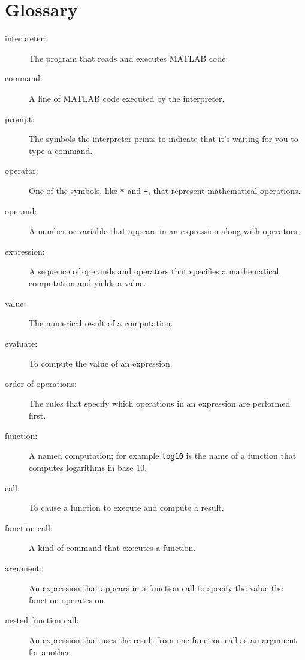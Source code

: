 \section{Glossary}

\begin{description}

\item[interpreter:] The program that reads and executes MATLAB code.

\item[command:] A line of MATLAB code executed by the interpreter.

\item[prompt:] The symbols the interpreter prints to indicate that it's
waiting for you to type a command.

\item[operator:] One of the symbols, like \lstinline{*} and \lstinline{+}, that
represent mathematical operations.

\item[operand:] A number or variable that appears in an expression along
with operators.

\item[expression:] A sequence of operands and operators that specifies
a mathematical computation and yields a value.

\item[value:] The numerical result of a computation.

\item[evaluate:] To compute the value of an expression.

\item[order of operations:] The rules that specify which operations
in an expression are performed first.

\item[function:] A named computation; for example \lstinline{log10} is the
name of a function that computes logarithms in base 10.

\item[call:] To cause a function to execute and compute a result.

\item[function call:] A kind of command that executes a function.

\item[argument:] An expression that appears in a function call to
specify the value the function operates on.

\item[nested function call:] An expression that uses the result from
one function call as an argument for another.


\end{description}
